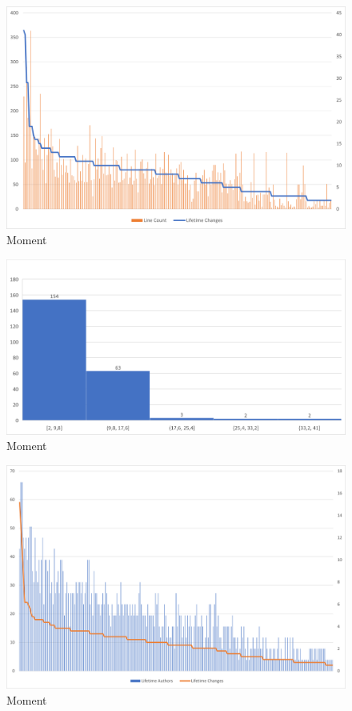 \begin{figure}[H]
    \centering
    \includegraphics[width=1\textwidth]{images/moment/moment-2.20.5-auth.png}
    \caption{Moment}
    \label{fig:moment-2.10.5-changes}
\end{figure}

\begin{figure}[H]
    \centering
    \includegraphics[width=1\textwidth]{images/moment/moment-2.20.5-hist.png}
    \caption{Moment}
    \label{fig:moment-2.10.5-changes}
\end{figure}


\begin{figure}[H]
    \centering
    \includegraphics[width=1\textwidth]{images/moment/moment-dev-changes.png}
    \caption{Moment}
    \label{fig:moment-2.10.5-changes}
\end{figure}

